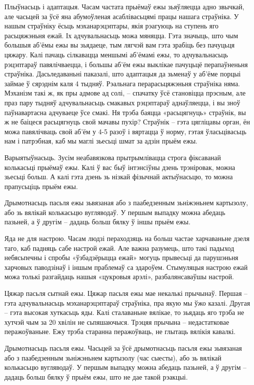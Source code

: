 Плыўнасьць і адаптацыя.
Часам частата прыёмаў ежы зьяўляецца адно звычкай, але часьцей за ўсё яна абумоўленая асаблівасьцямі працы нашага страўніка. У нашым страўніку ёсьць мэханарэцэптары, якія рэагуюць на ступень яго расьцяжэньня ежай. Іх адчувальнасьць можа мяняцца. Гэта значыць, што чым большыя аб'ёмы ежы вы зьядаеце, тым лягчэй вам гэта зрабіць без пачуцьця цяжару. Калі пачаць сілкавацца меншымі аб'ёмамі ежы, то адчувальнасьць рэцэптараў павялічваецца, і большы аб'ём ежы выклікае пачуцьцё перапаўненьня страўніка. Дасьледаваньні паказалі, што адаптацыя да зьменаў у аб'ёме порцыі займае ў сярэднім каля 4 тыдняў.
Рэальнага перарасьцяжэньня страўніка няма. Мэханізм такі ж, як пры адмове ад солі, – спачатку ўсё становіцца прэсным, але праз пару тыдняў адчувальнасьць смакавых рэцэптараў аднаўляецца, і вы зноў паўнавартасна адчуваеце ўсе смакі. Ня трэба баяцца «расьцягнуць» страўнік, вы ж не баіцеся расьцягнуць свой мачавы пухір? Страўнік – гэта цягліцавы орган, ён можа павялічваць свой аб'ём у 4-5 разоў і вяртацца ў норму, гэтая ўласьцівасьць нам і патрэбная, каб мы маглі зьесьці шмат за адзін прыём ежы.

Варыятыўнасьць.
Зусім неабавязкова прытрымлівацца строга фіксаванай колькасьці прыёмаў ежы. Калі ў вас быў інтэнсіўны дзень трэніровак, можна зьесьці больш. А калі гэта дзень зь нізкай фізычнай актыўнасьцю, то можна прапусьціць прыём ежы.

Дрымотнасьць пасьля ежы зьвязаная або з паабедзенным зьніжэньнем картызолу, або зь вялікай колькасьцю вугляводаў. У першым выпадку можна абедаць пазьней, а ў другім – дадаць больш бялку ў іншы прыём ежы.

Яда не для настрою.
Часам людзі пераходзяць на больш частае харчаваньне дзеля таго, каб падняць сабе настрой ежай. Але важна разумець, што такі падыход небясьпечны і спробы «ўзбадзёрыцца ежай» могуць прывесьці да парушэньня харчовых паводзінаў і іншым праблемаў са здароўем. Стымуляцыя настрою ежай можа толькі разгайдаць нашыя «цукровыя арэлі», разбалянсаваўшы настрой.

Цяжар пасьля сытнай ежы.
Цяжар пасьля ежы мае некалькі прычынаў. Першая – гэта адчувальнасьць мэханарэцэптараў страўніка, пра якую мы ўжо казалі. Другая – гэта высокая хуткасьць яды. Калі сталаваньне вялікае, то зьядаць яго трэба не хутчэй чым за 20 хвілін не сьпяшаючыся. Трэцяя прычына – недастатковае перажоўваньне. Ежу трэба старанна перажоўваць, не глытаць вялікія кавалкі.

Дрымотнасьць пасьля ежы.
Часьцей за ўсё дрымотнасьць пасьля ежы зьвязаная або з паабедзенным зьніжэньнем картызолу (час сыесты), або зь вялікай колькасьцю вугляводаў. У першым выпадку можна абедаць пазьней, а ў другім – дадаць больш бялку ў прыём ежы, што не дае такой рэакцыі.

